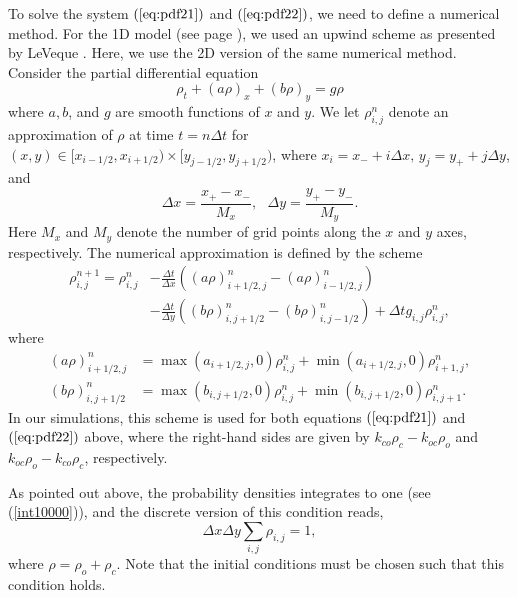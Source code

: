 To solve the system $(\ref{eq:pdf21})$ and $(\ref{eq:pdf22})$, we need to
define a numerical method. For the 1D model (see page \pageref{npdf}), we used
an upwind scheme as presented by LeVeque \cite{LeVeque2002}. Here,
we use the 2D version of the same numerical method. Consider the partial
differential equation
\[
\rho_{t}+(a\rho)_{x}+\left(  b\rho\right)  _{y}=g\rho
\]
where $a,b$, and $g$ are smooth functions of $x$ and $y.$ We let $\rho
_{i,j}^{n}$ denote an approximation of $\rho$ at time $t=n\Delta t$ for
$(x,y)\in\lbrack x_{i-1/2},x_{i+1/2})\times\lbrack y_{j-1/2},y_{j+1/2})$, where
$x_{i}=x_{-}+i\Delta x,\, y_{j}=y_{+}+j\Delta y$, and
\[
\Delta x=\frac{x_{+}-x_{-}}{M_{x}},\text{ }\Delta y=\frac{y_{+}-y_{-}}{M_{y}}.
\]
Here $M_{x}$ and $M_{y}$ denote the number of grid points along the $x$ and $y$
axes, respectively. The numerical approximation is defined by the scheme
\begin{align}
\rho_{i,j}^{n+1}=\rho_{i,j}^{n} &  -\frac{\Delta t}{\Delta x}\left(  \left(
a\rho\right)  _{i+1/2,j}^{n}-\left(  a\rho\right)  _{i-1/2,j}^{n}\right)
\nonumber\\
&  -\frac{\Delta t}{\Delta y}\left(  \left(  b\rho\right)  _{i,j+1/2}
^{n}-\left(  b\rho\right)  _{i,j-1/2}^{n}\right)  +\Delta tg_{i,j}\rho
_{i,j}^{n}, \label{eq:scheme2D}
\end{align}
where
\begin{align}
\left(  a\rho\right)  _{i+1/2,j}^{n} &  =\max(a_{i+1/2,j},0)\rho_{i,j}
^{n}+\min(a_{i+1/2,j},0)\rho_{i+1,j}^{n},\label{eq:flux_x}\\
\left(  b\rho\right)  _{i,j+1/2}^{n} &  =\max(b_{i,j+1/2},0)\rho_{i,j}
^{n}+\min(b_{i,j+1/2},0)\rho_{i,j+1}^{n}.\label{eq:flux_y}
\end{align}
In our simulations, this scheme is used for both equations $(\ref{eq:pdf21})$
and $(\ref{eq:pdf22})$ above, where the right-hand sides are given by
$k_{co}\rho_{c}-k_{oc}\rho_{o}$ and $k_{oc}\rho_{o}-k_{co}\rho_{c}$,
respectively. 

As pointed out above, the probability densities integrates to one (see (\ref{int10000})), and the discrete version of this condition
reads,
\begin{equation}
\Delta x \Delta y \sum_{i,j}  \rho_{i,j}=1,  \label{discrete_sumone}
\end{equation}
where $\rho=\rho_{o}+\rho_{c}$.  Note that the initial conditions must be chosen such that this condition holds.



